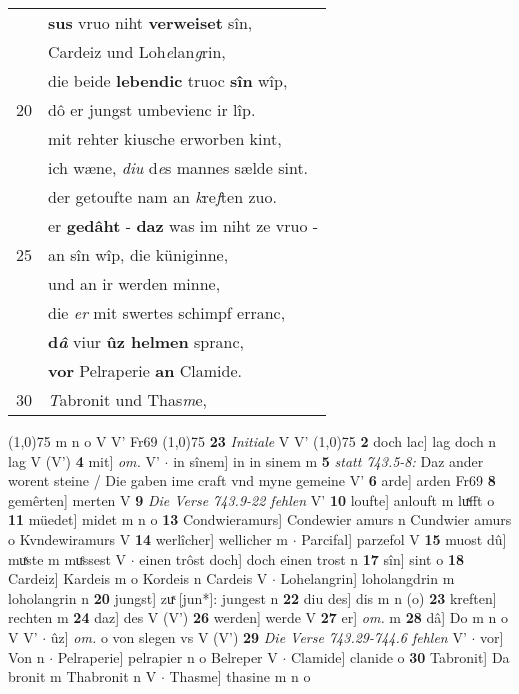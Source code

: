 \documentclass[8pt,a4paper,notitlepage]{article}
\begin{document}
\begin{table}[ht]
\begin{minipage}[t]{0.5\linewidth}
\begin{tabular}{rl}
 & \textbf{sus} vruo niht \textbf{verweiset} sîn,\\ 
 & Cardeiz und Loh\textit{e}lan\textit{g}rin,\\ 
 & die beide \textbf{lebendic} truoc \textbf{sîn} wîp,\\ 
20 & dô er jungst umbevienc ir lîp.\\ 
 & mit rehter kiusche erworben kint,\\ 
 & ich wæne, \textit{diu} d\textit{e}s mannes sælde sint.\\ 
 & der getoufte nam an \textit{k}re\textit{f}ten zuo.\\ 
 & er \textbf{gedâht} - \textbf{daz} was im niht ze vruo -\\ 
25 & an sîn wîp, die küniginne,\\ 
 & und an ir werden minne,\\ 
 & die \textit{er} mit swertes schimpf erranc,\\ 
 & \textbf{d\textit{â}} viur \textbf{ûz helmen} spranc,\\ 
 & \textbf{vor} Pelraperie \textbf{an} Clamide.\\ 
30 & \textit{T}abronit und Thas\textit{m}e,\\ 
\end{tabular}
\scriptsize
\line(1,0){75} \newline
m n o V V' Fr69 \newline
\line(1,0){75} \newline
\textbf{23} \textit{Initiale} V V'  \newline
\line(1,0){75} \newline
\textbf{2} doch lac] lag doch n lag V (V') \textbf{4} mit] \textit{om.} V'  $\cdot$ in sînem] in in sinem m \textbf{5} \textit{statt 743.5-8:} Daz ander worent steine / Die gaben ime craft vnd myne gemeine V'  \textbf{6} arde] arden Fr69 \textbf{8} gemêrten] merten V \textbf{9} \textit{Die Verse 743.9-22 fehlen} V'  \textbf{10} loufte] anlouft m luͯfft o \textbf{11} müedet] midet m n o \textbf{13} Condwieramurs] Condewier amurs n Cundwier amurs o Kvndewiramurs V \textbf{14} werlîcher] wellicher m  $\cdot$ Parcifal] parzefol V \textbf{15} muost dû] muͯste m muͤssest V  $\cdot$ einen trôst doch] doch einen trost n \textbf{17} sîn] sint o \textbf{18} Cardeiz] Kardeis m o Kordeis n Cardeis V  $\cdot$ Lohelangrin] loholangdrin m loholangrin n \textbf{20} jungst] zuͯ [jun*]: jungest n \textbf{22} diu des] dis m n (o) \textbf{23} kreften] rechten m \textbf{24} daz] des V (V') \textbf{26} werden] werde V \textbf{27} er] \textit{om.} m \textbf{28} dâ] Do m n o V V'  $\cdot$ ûz] \textit{om.} o von slegen vs V (V') \textbf{29} \textit{Die Verse 743.29-744.6 fehlen} V'   $\cdot$ vor] Von n  $\cdot$ Pelraperie] pelrapier n o Belreper V  $\cdot$ Clamide] clanide o \textbf{30} Tabronit] Da bronit m Thabronit n V  $\cdot$ Thasme] thasine m n o \newline
\end{minipage}
\end{table}
\end{document}

